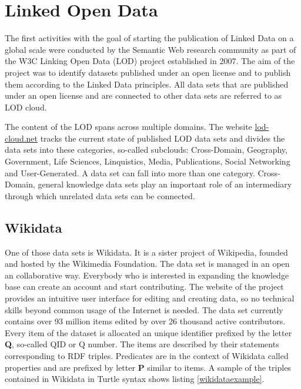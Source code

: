 
\section{Linked Open Data}

The first activities with the goal of starting the publication of Linked Data on a global scale were conducted by the Semantic Web research community as part of the W3C Linking Open Data (LOD) project established in 2007.\cite{Heath2011} The aim of the project was to identify datasets published under an open license and to publish them according to the Linked Data principles. All data sets that are published under an open license and are connected to other data sets are referred to as LOD cloud. 

The content of the LOD spans across multiple domains. The website \href{http://lod-cloud.net}{lod-cloud.net} tracks the current state of published LOD data sets and divides the data sets into these categories, so-called subclouds: Cross-Domain, Geography, Government, Life Sciences, Linquistics, Media, Publications, Social Networking and User-Generated. A data set can fall into more than one category. Cross-Domain, general knowledge data sets play an important role of an intermediary through which unrelated data sets can be connected. 

\subsection{Wikidata}

One of those data sets is Wikidata. It is a sister project of Wikipedia, founded and hosted by the Wikimedia Foundation. The data set is managed in an open an collaborative way. Everybody who is interested in expanding the knowledge base can create an account and start contributing. The website of the project provides an intuitive user interface for editing and creating data, so no technical skills beyond common usage of the Internet is needed. The data set currently contains over 93 million items edited by over 26 thousand active contributors. Every item of the dataset is allocated an unique identifier prefixed by the letter \textbf{Q}, so-called QID or Q number. The items are described by their statements corresponding to RDF triples. Predicates are in the context of Wikidata called properties and are prefixed by letter \textbf{P} similar to items. A sample of the triples contained in Wikidata in Turtle syntax shows listing \ref{wikidataexample}.

